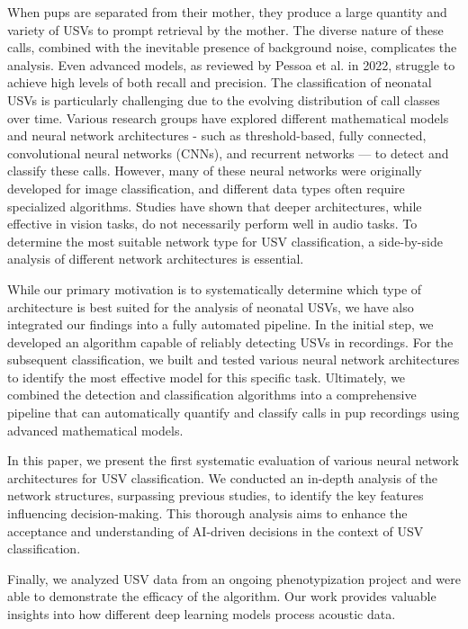 \documentclass[preprint,NumberedRefs]{JASA}
\begin{document}
When pups are separated from their mother, they produce a large quantity and variety of USVs to prompt retrieval by the mother. \cite{Ehret2005-ns} The diverse nature of these calls, combined with the inevitable presence of background noise, complicates the analysis. Even advanced models, as reviewed by Pessoa et al. in 2022, struggle to achieve high levels of both recall and precision. \cite{Pessoa2022-sy} The classification of neonatal USVs is particularly challenging due to the evolving distribution of call classes over time. \cite{Peleh2019-ic} Various research groups have explored different mathematical models and neural network architectures - such as threshold-based, fully connected, convolutional neural networks (CNNs), and recurrent networks — to detect and classify these calls. \cite{Pessoa2022-sy,Goussha2021-wm,Coffey2019-ve, De_Chaumont2021-ry, Fonseca2021-qr} However, many of these neural networks were originally developed for image classification, and different data types often require specialized algorithms. Studies have shown that deeper architectures, while effective in vision tasks, do not necessarily perform well in audio tasks. \cite{Koutini_2021} To determine the most suitable network type for USV classification, a side-by-side analysis of different network architectures is essential.

While our primary motivation is to systematically determine which type of architecture is best suited for the analysis of neonatal USVs, we have also integrated our findings into a fully automated pipeline. In the initial step, we developed an algorithm capable of reliably detecting USVs in recordings. For the subsequent classification, we built and tested various neural network architectures to identify the most effective model for this specific task. Ultimately, we combined the detection and classification algorithms into a comprehensive pipeline that can automatically quantify and classify calls in pup recordings using advanced mathematical models.

In this paper, we present the first systematic evaluation of various neural network architectures for USV classification. We conducted an in-depth analysis of the network structures, surpassing previous studies, to identify the key features influencing decision-making. This thorough analysis aims to enhance the acceptance and understanding of AI-driven decisions in the context of USV classification. 

Finally, we analyzed USV data from an ongoing phenotypization project and were able to demonstrate the efficacy of the algorithm. Our work provides valuable insights into how different deep learning models process acoustic data. 
\end{document}
